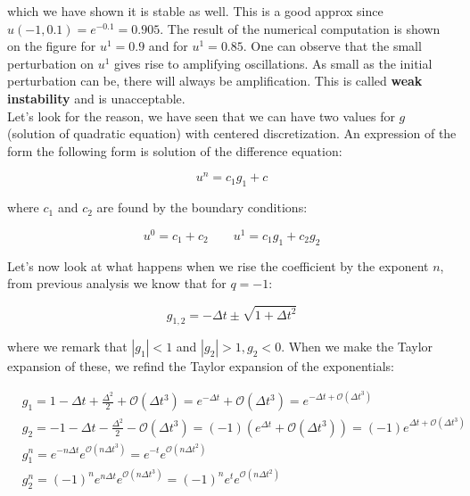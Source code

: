 which we have shown it is stable as well. This is a good approx since $u(-1,0.1) = e^{-0.1} = 0.905$. The result of the numerical computation is shown on the figure for $u^1 = 0.9$ and for $u^1 = 0.85$. One can observe that the small perturbation on $u^1$ gives rise to amplifying oscillations. As small as the initial perturbation can be, there will always be amplification. This is called \textbf{weak instability} and is unacceptable. \\

Let's look for the reason, we have seen that we can have two values for $g$ (solution of quadratic equation) with centered discretization. An expression of the form the following form is solution of the difference equation: 

\begin{equation}
u^n = c_1g_1 + c
\end{equation}

where $c_1$ and $c_2$ are found by the boundary conditions: 

\begin{equation}
u^0 = c_1 + c_2 \qquad u^1 = c_1 g_1 + c_2 g_2
\end{equation}

Let's now look at what happens when we rise the coefficient by the exponent $n$, from previous analysis we know that for $q=-1$:

\begin{equation}
g_{1,2} = -\Delta t \pm \sqrt{1 + \Delta t^2}
\end{equation}

where we remark that $|g_1| < 1$ and $|g_2|>1, g_2 < 0$. When we make the Taylor expansion of these, we refind the Taylor expansion of the exponentials: 

\begin{equation}
\begin{aligned}
&g_1 = 1 -\Delta t + \frac{\Delta ^2}{2} + \mathcal{O}(\Delta t^3) = e^{-\Delta t} + \mathcal{O} (\Delta t^3) = e^{-\Delta t + \mathcal{O}(\Delta t^3)}\\
&g_2 = -1 -\Delta t - \frac{\Delta ^2}{2} - \mathcal{O}(\Delta t^3) = (-1)(e^{\Delta t} + \mathcal{O} (\Delta t^3)) = (-1)e^{\Delta t + \mathcal{O}(\Delta t^3)}\\
&g_1^n = e^{-n\Delta t}e^{\mathcal{O}(n\Delta t^3)}  = e^{-t}e^{\mathcal{O}(n\Delta t^2)}\\
&g_2^n = (-1)^ne^{n\Delta t}e^{\mathcal{O}(n\Delta t^3)}  = (-1)^ne^{t}e^{\mathcal{O}(n\Delta t^2)}
\end{aligned}
\end{equation}

